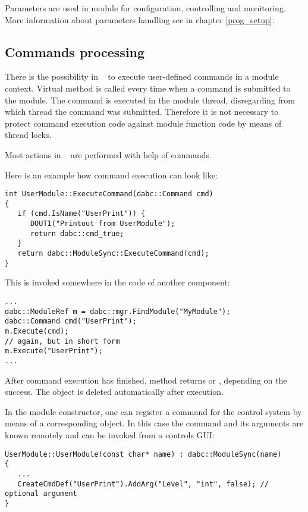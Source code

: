 Parameters are used in module for configuration, controlling and monitoring.
More information about parameters handling see in chapter \ref{prog_setup}.


\subsection{Commands processing}

There is the possibility in \dabc~ to execute user-defined commands in a module context.
Virtual method  is called every time when a command is submitted
to the module. The command is  executed in the module thread,
disregarding from which thread the command was submitted. 
Therefore it is not necessary to protect command execution code against
module function code by means of thread locks.

Most actions in \dabc~ are performed with help of commands. 

Here is an example how command execution can look like:
\begin{small}
\begin{verbatim}
int UserModule::ExecuteCommand(dabc::Command cmd) 
{
   if (cmd.IsName("UserPrint")) {
      DOUT1("Printout from UserModule");
      return dabc::cmd_true;
   }
   return dabc::ModuleSync::ExecuteCommand(cmd);
}
\end{verbatim}
\end{small}

This is invoked somewhere in the code of another component:
\begin{small}
\begin{verbatim}
...
dabc::ModuleRef m = dabc::mgr.FindModule("MyModule"); 
dabc::Command cmd("UserPrint");
m.Execute(cmd);
// again, but in short form
m.Execute("UserPrint");
...
\end{verbatim}
\end{small}
After command execution has finished, 
method  returns  or  ,
depending on the success. The  object 
is deleted automatically after execution.  

In the module constructor, one can register a command 
for the control system by means of a corresponding 
 object. 
In this case the command and its arguments are known
remotely and can be invoked from a controls GUI:
\begin{small}
\begin{verbatim}
UserModule::UserModule(const char* name) : dabc::ModuleSync(name) 
{
   ...
   CreateCmdDef("UserPrint").AddArg("Level", "int", false); // optional argument
}
\end{verbatim}
\end{small}


